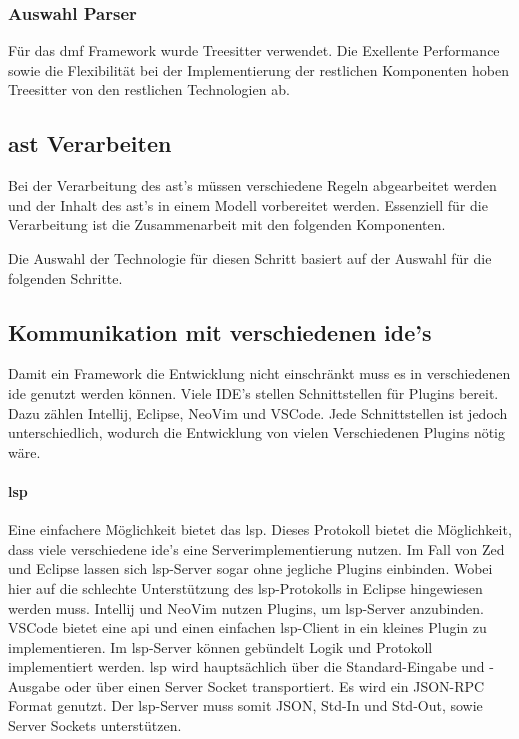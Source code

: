 \documentclass[./einleitung.tex]{subfiles}
\begin{document}
\subsubsection{Auswahl Parser}
Für das \acrshort{dmf} Framework wurde Treesitter verwendet.
Die Exellente Performance sowie die Flexibilität bei der Implementierung der restlichen Komponenten hoben Treesitter von den restlichen Technologien ab.


\subsection{\acrshort{ast} Verarbeiten}
Bei der Verarbeitung des \acrshort{ast}'s müssen verschiedene Regeln abgearbeitet werden und der Inhalt des \acrshort{ast}'s in einem Modell vorbereitet werden.
Essenziell für die Verarbeitung ist die Zusammenarbeit mit den folgenden Komponenten.

Die Auswahl der Technologie für diesen Schritt basiert auf der Auswahl für die folgenden Schritte.

\subsection{Kommunikation mit verschiedenen \acrshort{ide}'s}
Damit ein Framework die Entwicklung nicht einschränkt muss es in verschiedenen \acrfull{ide} genutzt werden können.
Viele IDE's stellen Schnittstellen für Plugins bereit. Dazu zählen Intellij, Eclipse, NeoVim und VSCode.
Jede Schnittstellen ist jedoch unterschiedlich, wodurch die Entwicklung von vielen Verschiedenen Plugins nötig wäre.
\paragraph{\acrfull{lsp}}
Eine einfachere Möglichkeit bietet das \acrfull{lsp}.
Dieses Protokoll bietet die Möglichkeit, dass viele verschiedene \acrshort{ide}'s eine Serverimplementierung nutzen.
Im Fall von Zed und Eclipse lassen sich \acrlong{lsp}-Server sogar ohne jegliche Plugins einbinden.
Wobei hier auf die schlechte Unterstützung des \acrlong{lsp}-Protokolls in Eclipse hingewiesen werden muss.
Intellij und NeoVim nutzen Plugins, um \acrlong{lsp}-Server anzubinden.
VSCode bietet eine \acrlong{api} und einen einfachen \acrlong{lsp}-Client in ein kleines Plugin zu implementieren.
Im \acrlong{lsp}-Server können gebündelt Logik und Protokoll implementiert werden.
\newline\newline
\acrlong{lsp} wird hauptsächlich über die Standard-Eingabe und -Ausgabe oder über einen Server Socket transportiert.
Es wird ein JSON-RPC Format genutzt. %
Der \acrlong{lsp}-Server muss somit JSON, Std-In und Std-Out, sowie Server Sockets unterstützen.
\end{document}
